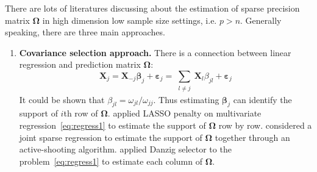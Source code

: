 \documentclass[11pt]{article}
\newcommand{\bX}{\mathbf X}
\newcommand{\bbeta}{{\boldsymbol{\beta}}}
\newcommand{\bvarepsilon}{\boldsymbol{\varepsilon}}
\newcommand{\bOmega}{{\boldsymbol{\Omega}}}
\begin{document}
There are lots of literatures discussing about the estimation of sparse precision matrix $\bOmega$ in high dimension low sample size settings, i.e. $p > n$. Generally speaking, there are three main approaches. 
\begin{enumerate}
	\item \textbf{Covariance selection approach.} 
	There is a connection between linear regression and prediction matrix $\bOmega$:
	\begin{equation}
	\label{eq:regress1}
	\bX_j = \bX_{-j} \bbeta_j + \bvarepsilon_j = \sum_{\substack{l \neq j}} \bX_l \beta_{jl} + \bvarepsilon_j
	\end{equation}
    It could be shown that $\beta_{jl} = \omega_{jl}/\omega_{jj}$. Thus estimating $\bbeta_j$ can identify the support of $i$th row of $\bOmega$. \cite{meinshausen2006high} applied LASSO penalty \citep{tibshirani1996regression}  on multivariate regression~\ref{eq:regress1} to estimate the support of $\bOmega$ row by row. \cite{peng2012partial} considered a joint sparse regression to estimate the support of $\bOmega$ together through an active-shooting algorithm. \cite{yuan2010high} applied Danzig selector \citep{candes2007dantzig} to the problem~\ref{eq:regress1} to estimate each column of $\bOmega$.
    

\end{enumerate}
\end{document}
